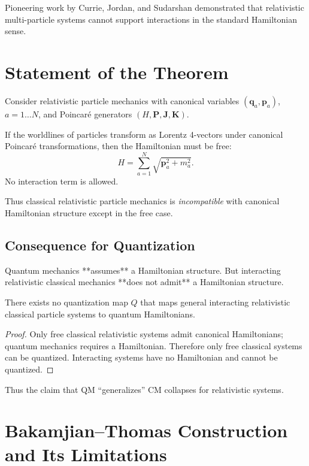 \documentclass[12pt,oneside]{book}
\begin{document}
Pioneering work by Currie, Jordan, and Sudarshan demonstrated that relativistic multi-particle systems cannot support interactions in the standard Hamiltonian sense.

\section{Statement of the Theorem}

Consider relativistic particle mechanics with canonical variables $(\mathbf{q}_a, \mathbf{p}_a)$, $a=1\dots N$, and Poincaré generators $(H,\mathbf{P},\mathbf{J},\mathbf{K})$.

\begin{theorem}
If the worldlines of particles transform as Lorentz 4-vectors under canonical Poincaré transformations, then the Hamiltonian must be free:
\[
H = \sum_{a=1}^N \sqrt{\mathbf{p}_a^2 + m_a^2}.
\]
No interaction term is allowed.
\end{theorem}

Thus classical relativistic particle mechanics is \emph{incompatible} with canonical Hamiltonian structure except in the free case.

\subsection{Consequence for Quantization}

Quantum mechanics **assumes** a Hamiltonian structure.  
But interacting relativistic classical mechanics **does not admit** a Hamiltonian structure.

\begin{theorem}
There exists no quantization map $Q$ that maps general interacting relativistic classical particle systems to quantum Hamiltonians.
\end{theorem}

\begin{proof}
Only free classical relativistic systems admit canonical Hamiltonians; quantum mechanics requires a Hamiltonian.  
Therefore only free classical systems can be quantized.  
Interacting systems have no Hamiltonian and cannot be quantized.
\end{proof}

Thus the claim that QM “generalizes” CM collapses for relativistic systems.

\section{Bakamjian–Thomas Construction and Its Limitations}
\end{document}
